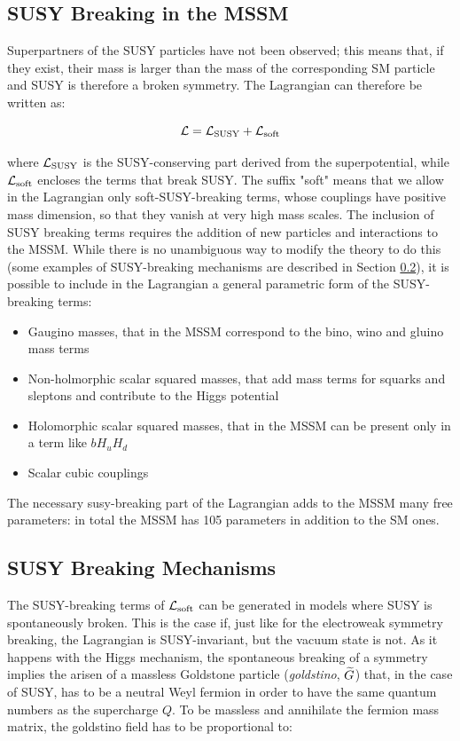 \subsection{SUSY Breaking in the MSSM}

Superpartners of the SUSY particles have not been observed; this means that, if they exist, their mass is larger than the mass of the corresponding SM particle and SUSY is therefore a broken symmetry. The Lagrangian can therefore be written as:

\begin{equation}
\mathcal{L} = \mathcal{L}_{\rm SUSY} + \mathcal{L}_{\rm soft}
\end{equation}

where $\mathcal{L}_{\rm SUSY}$ is the SUSY-conserving part derived from the superpotential, while $\mathcal{L}_{\rm soft}$ encloses the terms that break SUSY. The suffix "soft" means that we allow in the Lagrangian only soft-SUSY-breaking terms, whose couplings have positive mass dimension, so that they vanish at very high mass scales. The inclusion of SUSY breaking terms requires the addition of new particles and interactions to the MSSM. While there is no unambiguous way to modify the theory to do this (some examples of SUSY-breaking mechanisms are described in Section \ref{sec:susybreaking}), it is possible to include in the Lagrangian a general parametric form of the SUSY-breaking terms:
\begin{itemize}
\item Gaugino masses, that in the MSSM correspond to the bino, wino and gluino mass terms
\item Non-holmorphic scalar squared masses, that add mass terms for squarks and sleptons and contribute to the Higgs potential
\item Holomorphic scalar squared masses, that in the MSSM can be present only in a term like $b H_u H_d$
\item Scalar cubic couplings
\end{itemize}  

The necessary susy-breaking part of the Lagrangian adds to the MSSM many free parameters: in total the MSSM has 105 parameters in addition to the SM ones.


\subsection{SUSY Breaking Mechanisms}
\label{sec:susybreaking}

The SUSY-breaking terms of $\mathcal{L}_{\rm soft}$ can be generated in models where SUSY is spontaneously broken. This is the case if, just like  for the electroweak symmetry breaking, the Lagrangian is SUSY-invariant, but the vacuum state is not. As it happens with the Higgs mechanism, the spontaneous breaking of a symmetry implies the arisen of a massless Goldstone particle (\textit{goldstino}, $\widetilde{G}$) that, in the case of SUSY, has to be a neutral Weyl fermion in order to have the same quantum numbers as the supercharge $Q$. To be massless and annihilate the fermion mass matrix, the goldstino field has to be proportional to:

